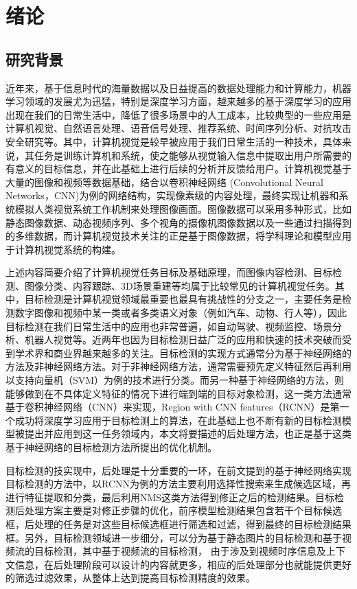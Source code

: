 \documentclass[winfonts,master,twoside,AutoFakeBold= {2}]{njuthesis}
\begin{document}
\mainmatter

\chapter{绪论}\label{chapter_introduction}
\section{研究背景}
近年来，基于信息时代的海量数据以及日益提高的数据处理能力和计算能力，机器学习领域的发展尤为迅猛，特别是深度学习方面，越来越多的基于深度学习的应用出现在我们的日常生活中，降低了很多场景中的人工成本，比较典型的一些应用是计算机视觉、自然语言处理、语音信号处理、推荐系统、时间序列分析、对抗攻击安全研究等。其中，计算机视觉是较早被应用于我们日常生活的一种技术，具体来说，其任务是训练计算机和系统，使之能够从视觉输入信息中提取出用户所需要的有意义的目标信息，并在此基础上进行后续的分析并反馈给用户。计算机视觉基于大量的图像和视频等数据基础，结合以卷积神经网络 (Convolutional Neural Networks，CNN)为例的网络结构，实现像素级的内容处理，最终实现让机器和系统模拟人类视觉系统工作机制来处理图像画面。图像数据可以采用多种形式，比如静态图像数据、动态视频序列、多个视角的摄像机图像数据以及一些通过扫描得到的多维数据，而计算机视觉技术关注的正是基于图像数据，将学科理论和模型应用于计算机视觉系统的构建。

上述内容简要介绍了计算机视觉任务目标及基础原理，而图像内容检测、目标检测、图像分类、内容跟踪、3D场景重建等均属于比较常见的计算机视觉任务。其中，目标检测是计算机视觉领域最重要也最具有挑战性的分支之一，主要任务是检测数字图像和视频中某一类或者多类语义对象（例如汽车、动物、行人等），因此目标检测在我们日常生活中的应用也非常普遍，如自动驾驶、视频监控、场景分析、机器人视觉等。近两年也因为目标检测日益广泛的应用和快速的技术突破而受到学术界和商业界越来越多的关注。目标检测的实现方式通常分为基于神经网络的方法及非神经网络方法。对于非神经网络方法，通常需要预先定义特征然后再利用以支持向量机（SVM）为例的技术进行分类。而另一种基于神经网络的方法，则能够做到在不具体定义特征的情况下进行端到端的目标对象检测，这一类方法通常基于卷积神经网络（CNN）来实现，Region with CNN features（RCNN）是第一个成功将深度学习应用于目标检测上的算法，在此基础上也不断有新的目标检测模型被提出并应用到这一任务领域内，本文将要描述的后处理方法，也正是基于这类基于神经网络的目标检测方法所提出的优化机制。

目标检测的技实现中，后处理是十分重要的一环，在前文提到的基于神经网络实现目标检测的方法中，以RCNN为例的方法主要利用选择性搜索来生成候选区域，再进行特征提取和分类，最后利用NMS这类方法得到修正之后的检测结果。目标检测后处理方案主要是对修正步骤的优化，前序模型检测结果包含若干个目标候选框，后处理的任务是对这些目标候选框进行筛选和过滤，得到最终的目标检测结果框。另外，目标检测领域进一步细分，可以分为基于静态图片的目标检测和基于视频流的目标检测，其中基于视频流的目标检测， 由于涉及到视频时序信息及上下文信息，在后处理阶段可以设计的内容就更多，相应的后处理部分也就能提供更好的筛选过滤效果，从整体上达到提高目标检测精度的效果。
\end{document}
